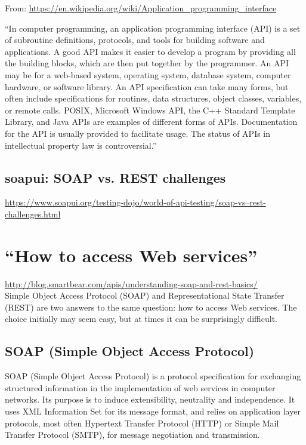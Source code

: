 \documentclass[11pt]{article}
\begin{document}
From: 
\href{https://en.wikipedia.org/wiki/Application\_programming\_interface}{https://en.wikipedia.org/wiki/Application\_programming\_interface}

\noindent
``In computer programming, an application programming interface (API) is a set of subroutine definitions, protocols, and tools for building software and applications. A good API makes it easier to develop a program by providing all the building blocks, which are then put together by the programmer. An API may be for a web-based system, operating system, database system, computer hardware, or software library. An API specification can take many forms, but often include specifications for routines, data structures, object classes, variables, or remote calls. POSIX, Microsoft Windows API, the C++ Standard Template Library, and Java APIs are examples of different forms of APIs. Documentation for the API is usually provided to facilitate usage. The status of APIs in intellectual property law is controversial.''

    \subsection{soapui: SOAP vs. REST challenges}
\href{https://www.soapui.org/testing-dojo/world-of-api-testing/soap-vs--rest-challenges.html}{https://www.soapui.org/testing-dojo/world-of-api-testing/soap-vs--rest-challenges.html}

\newpage
\section{``How to access Web services''}
\href{http://blog.smartbear.com/apis/understanding-soap-and-rest-basics/}{http://blog.smartbear.com/apis/understanding-soap-and-rest-basics/}\\
Simple Object Access Protocol (SOAP) and Representational State Transfer (REST) are two answers to the same question: how to access Web services. The choice initially may seem easy, but at times it can be surprisingly difficult.

\subsection{SOAP (Simple Object Access Protocol)} 
SOAP (Simple Object Access Protocol) is a protocol specification for
exchanging structured information in the implementation of web
services in computer networks. Its purpose is to induce extensibility,
neutrality and independence. It uses XML Information Set for its
message format, and relies on application layer protocols, most often
Hypertext Transfer Protocol (HTTP) or Simple Mail Transfer Protocol
(SMTP), for message negotiation and transmission.
\end{document}
